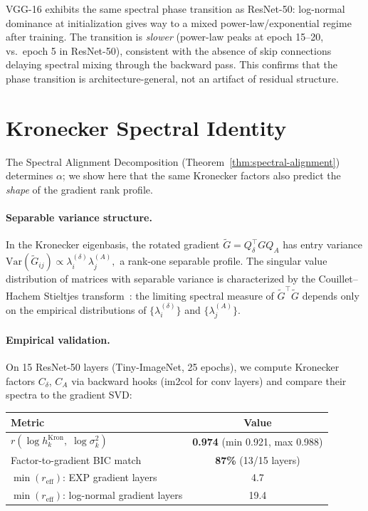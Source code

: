 \documentclass{article}
\begin{document}
\noindent VGG-16 exhibits the same spectral phase transition as ResNet-50: log-normal dominance at initialization gives way to a mixed power-law/exponential regime after training. The transition is \emph{slower} (power-law peaks at epoch 15--20, vs.\ epoch 5 in ResNet-50), consistent with the absence of skip connections delaying spectral mixing through the backward pass. This confirms that the phase transition is architecture-general, not an artifact of residual structure.

\section{Kronecker Spectral Identity}\label{app:kronecker-identity}

The Spectral Alignment Decomposition (Theorem~\ref{thm:spectral-alignment}) determines $\alpha$; we show here that the same Kronecker factors also predict the \emph{shape} of the gradient rank profile.

\paragraph{Separable variance structure.}
In the Kronecker eigenbasis, the rotated gradient $\widetilde{G} = Q_\delta^\top G Q_A$ has entry variance
$\mathrm{Var}(\widetilde{G}_{ij}) \propto \lambda_i^{(\delta)} \lambda_j^{(A)},$
a rank-one separable profile. The singular value distribution of matrices with separable variance is characterized by the Couillet--Hachem Stieltjes transform~\cite{couillet2014separable}: the limiting spectral measure of $\widetilde{G}^\top \widetilde{G}$ depends only on the empirical distributions of $\{\lambda_i^{(\delta)}\}$ and $\{\lambda_j^{(A)}\}$.

\paragraph{Empirical validation.}
On 15 ResNet-50 layers (Tiny-ImageNet, 25 epochs), we compute Kronecker factors $C_\delta$, $C_A$ via backward hooks (im2col for conv layers) and compare their spectra to the gradient SVD:

\begin{center}
\small
\begin{tabular}{lc}
\toprule
\textbf{Metric} & \textbf{Value} \\
\midrule
$r(\log h_k^{\mathrm{Kron}},\; \log \sigma_k^2)$ & \textbf{0.974} (min 0.921, max 0.988) \\
Factor-to-gradient BIC match & \textbf{87\%} (13/15 layers) \\
$\min(r_{\mathrm{eff}})$: EXP gradient layers & 4.7 \\
$\min(r_{\mathrm{eff}})$: log-normal gradient layers & 19.4 \\
\bottomrule
\end{tabular}
\end{center}
\end{document}
